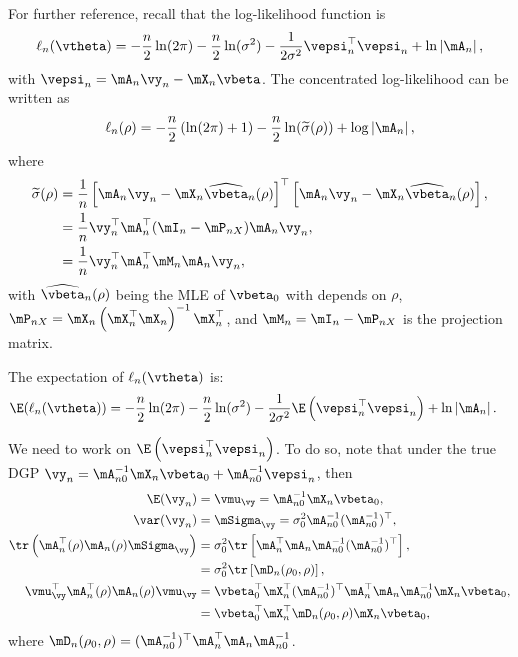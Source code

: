 \documentclass[english,12pt]{book}\usepackage[]{graphicx}\usepackage[]{xcolor}
\begin{document}
\begin{subappendices}
For further reference, recall that the log-likelihood function is 
\begin{equation*}
\ell_n(\vtheta) = -\frac{n}{2}\ln (2\pi) - \frac{n}{2}\ln(\sigma^2) - \frac{1}{2\sigma^2}\vepsi_n^\top\vepsi_n + \ln\left|\mA_n\right|,
\end{equation*}
with $\vepsi_n = \mA_n\vy_n - \mX_n\vbeta$. The concentrated log-likelihood can be written as
\begin{equation*}
 \ell_n(\rho) =-\frac{n}{2}\left(\ln(2\pi) + 1\right) - \frac{n}{2}\ln(\widetilde{\sigma}(\rho)) + \log\left|\mA_n\right|,
\end{equation*}
%
where
\begin{equation}\label{eq:sigma-mle-consistency}
\begin{aligned}
\widetilde{\sigma}(\rho) & = \frac{1}{n}\left[\mA_n\vy_n - \mX_n\widehat{\vbeta}_n(\rho)\right]^\top \left[\mA_n\vy_n - \mX_n\widehat{\vbeta}_n(\rho)\right],  \\
& = \frac{1}{n}\vy_n^\top\mA_n^\top(\mI_n - \mP_{nX})\mA_n\vy_n, \\
& = \frac{1}{n}\vy_n^\top\mA_n^\top\mM_n\mA_n\vy_n,
\end{aligned}
\end{equation}
%
with $\widehat{\vbeta}_n(\rho)$ being the MLE of $\vbeta_0$ with depends on $\rho$, $\mP_{nX} = \mX_n\left(\mX_n^\top\mX_n\right)^{-1}\mX_n^\top$, and $\mM_n = \mI_n - \mP_{nX}$ is the projection matrix.

The expectation of $\ell_n(\vtheta)$ is:
\begin{equation}\label{eq:expectation-log-slm}
  \begin{aligned}
    \E(\ell_n(\vtheta)) & = -\frac{n}{2}\ln (2\pi) - \frac{n}{2}\ln(\sigma^2) - \frac{1}{2\sigma^2}\E\left(\vepsi_n^\top\vepsi_n\right) + \ln\left|\mA_n\right|.
  \end{aligned}
\end{equation}

We need to work on $\E\left(\vepsi_n^\top\vepsi_n\right)$. To do so, note that under the true DGP $\vy_n = \mA_{n0}^{-1}\mX_n\vbeta_0 + \mA_{n0}^{-1}\vepsi_n$, then
\begin{equation}\label{eq:equality-for-consistency}
\begin{aligned}
\E(\vy_n) & = \vmu_{\vy}     = \mA_{n0}^{-1}\mX_n\vbeta_0, \\
\var(\vy_n)& = \mSigma_{\vy}  = \sigma_0^2\mA_{n0}^{-1}(\mA_{n0}^{-1})^\top, \\
\tr\left(\mA_n^\top(\rho)\mA_n(\rho)\mSigma_{\vy}\right) & = \sigma_0^2\tr\left[\mA_n^\top\mA_n\mA_{n0}^{-1}(\mA_{n0}^{-1})^\top\right], \\
& = \sigma_0^2\tr\left[\mD_n(\rho_0, \rho)\right], \\
\vmu_{\vy}^\top\mA_n^\top(\rho)\mA_n(\rho)\vmu_{\vy} & = \vbeta_0^\top\mX_n^\top(\mA_{n0}^{-1})^\top\mA_n^\top\mA_n\mA_{n0}^{-1}\mX_n\vbeta_0, \\
& = \vbeta_0^\top\mX_n^\top\mD_n(\rho_0, \rho)\mX_n\vbeta_0,
\end{aligned}
\end{equation}
%
where $\mD_n(\rho_0, \rho) = (\mA_{n0}^{-1})^\top\mA_n^\top\mA_n\mA_{n0}^{-1}$.


\end{subappendices}
\end{document}
